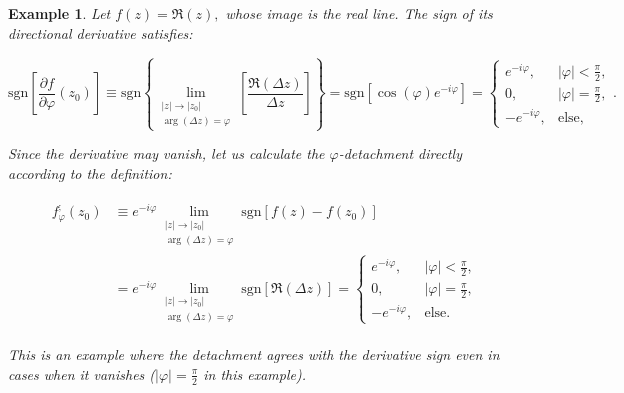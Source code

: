 \documentclass[11pt]{book}
\newtheorem{exm}[thm]{Example}
\begin{document}
\begin{exm}Let $f\left(z\right)=\Re\left(z\right),$ whose image is the real line. The sign of its directional derivative satisfies:

$$\text{sgn}\left[\frac{\partial f}{\partial\varphi}\left(z_{0}\right)\right]\equiv \text{sgn}\left\{ \underset{\begin{array}{c}
\left|z\right|\to\left|z_{0}\right|\\
\arg\left(\Delta z\right)=\varphi
\end{array}}{\lim}\left[\frac{\Re\left(\Delta z\right)}{\Delta z}\right]\right\} =\text{sgn}\left[\cos\left(\varphi\right)e^{-i\varphi}\right]=\begin{cases}
e^{-i\varphi}, & \left|\varphi\right|<\frac{\pi}{2},\\
0, & \left|\varphi\right|=\frac{\pi}{2},\\
-e^{-i\varphi}, & \text{else},
\end{cases}.$$

Since the derivative may vanish, let us calculate the $\varphi$-detachment directly according to the definition:

\begin{align}
&\begin{aligned}
f_{\varphi}^{;}\left(z_{0}\right) &\equiv e^{-i\varphi}\underset{\begin{array}{c}
\left|z\right|\to\left|z_{0}\right|\\
\arg\left(\Delta z\right)=\varphi
\end{array}}{\lim}\text{sgn}\left[f\left(z\right)-f\left(z_{0}\right)\right] \\
&=e^{-i\varphi}\underset{\begin{array}{c}
\left|z\right|\to\left|z_{0}\right|\\
\arg\left(\Delta z\right)=\varphi
\end{array}}{\lim}\text{sgn}\left[\Re\left(\Delta z\right)\right]=\begin{cases}
e^{-i\varphi}, & \left|\varphi\right|<\frac{\pi}{2},\\
0, & \left|\varphi\right|=\frac{\pi}{2},\\
-e^{-i\varphi}, & \text{else}.
\end{cases}
\end{aligned}
\end{align}

This is an example where the detachment agrees with the derivative sign even in cases when it vanishes ($\left|\varphi\right|=\frac{\pi}{2}$ in this example).
\end{exm}
\end{document}
